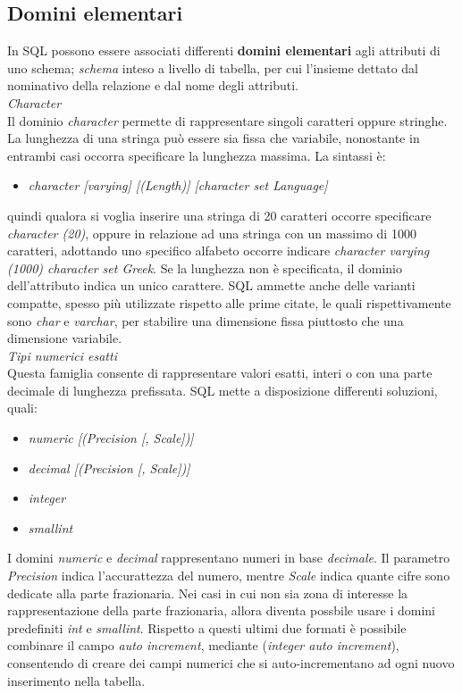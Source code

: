 \documentclass{article}
\begin{document}
\subsection*{Domini elementari}
\large
In SQL possono essere associati differenti \textbf{domini elementari} agli attributi di uno schema; \textit{schema} inteso a livello di tabella, per cui l'insieme dettato dal nominativo della relazione e dal nome degli attributi.\vspace*{14pt}\\
\textit{Character}\\Il dominio \textit{character} permette di rappresentare singoli caratteri oppure stringhe. La lunghezza di una stringa può essere sia fissa che variabile, nonostante in entrambi casi occorra specificare la lunghezza massima. La sintassi è:
\begin{itemize}[label={ }, leftmargin=1cm]
    \item \textit{character [varying] [(Length)] [character set Language]}
\end{itemize}
quindi qualora si voglia inserire una stringa di 20 caratteri occorre specificare \textit{character (20)}, oppure in relazione ad una stringa con un massimo di 1000 caratteri, adottando uno specifico alfabeto occorre indicare \textit{character varying (1000) character set Greek}. Se la lunghezza non è specificata, il dominio dell'attributo indica un unico carattere. SQL ammette anche delle varianti compatte, spesso più utilizzate rispetto alle prime citate, le quali rispettivamente sono \textit{char} e \textit{varchar}, per stabilire una dimensione fissa piuttosto che una dimensione variabile.\vspace*{14pt}\\
\textit{Tipi numerici esatti}\\Questa famiglia consente di rappresentare valori esatti, interi o con una parte decimale di lunghezza prefissata. SQL mette a disposizione differenti soluzioni, quali:
\begin{itemize}[label={ }, leftmargin=1cm]
    \itemsep0em
    \item \textit{numeric [(Precision [, Scale])]}
    \item \textit{decimal [(Precision [, Scale])]}
    \item \textit{integer}
    \item \textit{smallint}
\end{itemize}
I domini \textit{numeric} e \textit{decimal} rappresentano numeri in base \textit{decimale}. Il parametro \textit{Precision} indica l'accurattezza del numero, mentre \textit{Scale} indica quante cifre sono dedicate alla parte frazionaria. Nei casi in cui non sia zona di interesse la rappresentazione della parte frazionaria, allora diventa possbile usare i domini predefiniti \textit{int} e \textit{smallint}. Rispetto a questi ultimi due formati è possibile combinare il campo \textit{auto increment}, mediante (\textit{integer auto increment}), consentendo di creare dei campi numerici che si auto-incrementano ad ogni nuovo inserimento nella tabella.\vspace*{14pt}\\
\end{document}
